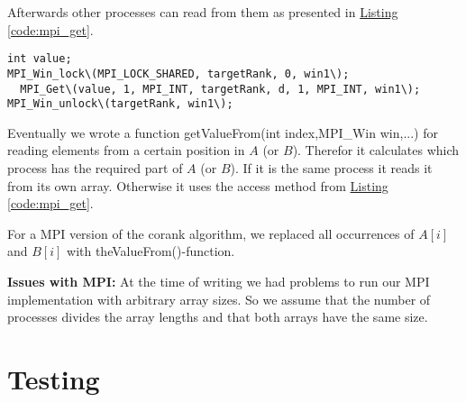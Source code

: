 Afterwards other processes can read from them as presented in \hyperref[code:mpi_get]{Listing \ref*{code:mpi_get}}.

\begin{lstlisting}[caption=window to share arrays, label=code:mpi_get,style=c]
int value;
MPI_Win_lock\(MPI_LOCK_SHARED, targetRank, 0, win1\);
  MPI_Get\(value, 1, MPI_INT, targetRank, d, 1, MPI_INT, win1\);
MPI_Win_unlock\(targetRank, win1\);
\end{lstlisting}

Eventually we wrote a function getValueFrom(int index,MPI\_Win win,...) for reading elements from a certain position in $A$ (or $B$).
Therefor it calculates which process has the required part of $A$ (or $B$).
If it is the same process it reads it from its own array.
Otherwise it uses the access method from \hyperref[code:mpi_get]{Listing \ref*{code:mpi_get}}.

For a MPI version of the corank algorithm, we replaced all occurrences of $A[i]$ and $B[i]$ with theValueFrom()-function.


\textbf{Issues with MPI:}
At the time of writing we had problems to run our MPI implementation with arbitrary array sizes.
So we assume that the number of processes divides the array lengths and that both arrays have the same size.
\section{Testing}

